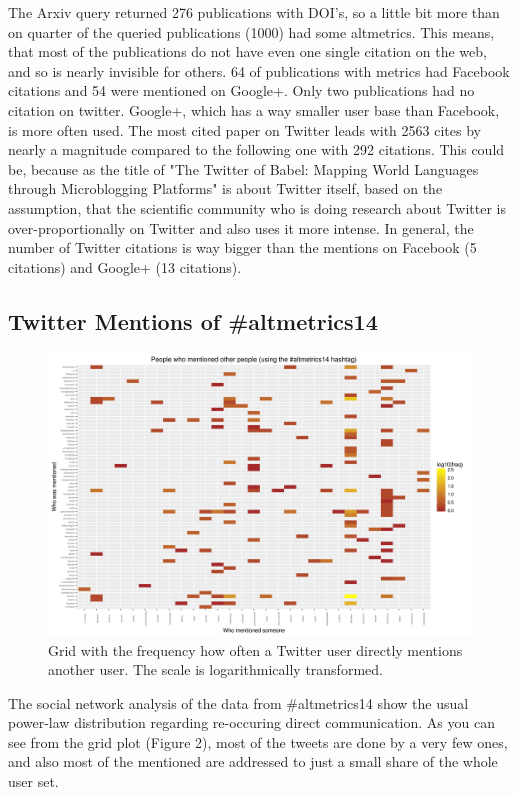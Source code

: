 \documentclass[fleqn,10pt,lineno]{wlpeerj} %
\begin{document}
The Arxiv query returned 276 publications with DOI's, so a little bit more than on quarter of the queried publications (1000) had some altmetrics. This means, that most of the publications do not have even one single citation on the web, and so is nearly invisible for others. 64 of publications with metrics had Facebook citations and 54 were mentioned on Google+. Only two publications had no citation on twitter. Google+, which has a way smaller user base than Facebook, is more often used. The most cited paper on Twitter leads with 2563 cites by nearly a magnitude compared to the following one with 292 citations. This could be, because as the title of "The Twitter of Babel: Mapping World Languages through Microblogging Platforms" is about Twitter itself, based on the assumption, that the scientific community who is doing research about Twitter is over-proportionally on Twitter and also uses it more intense. In general, the number of Twitter citations is way bigger than the mentions on Facebook (5 citations) and Google+ (13 citations). 

\subsection*{Twitter Mentions of \#altmetrics14}

\begin{figure}[ht]\centering
\includegraphics[width=\linewidth]{altmetrics14_mentions-2.png}
\caption{Grid with the frequency how often a Twitter user directly mentions another user. The scale is logarithmically transformed.}
\label{fig:twitter-mentions}
\end{figure}

The social network analysis of the data from \#altmetrics14 show the usual power-law distribution regarding re-occuring direct communication. As you can see from the grid plot (Figure 2), most of the tweets are done by a very few ones, and also most of the mentioned are addressed to just a small share of the whole user set. 
\end{document}
